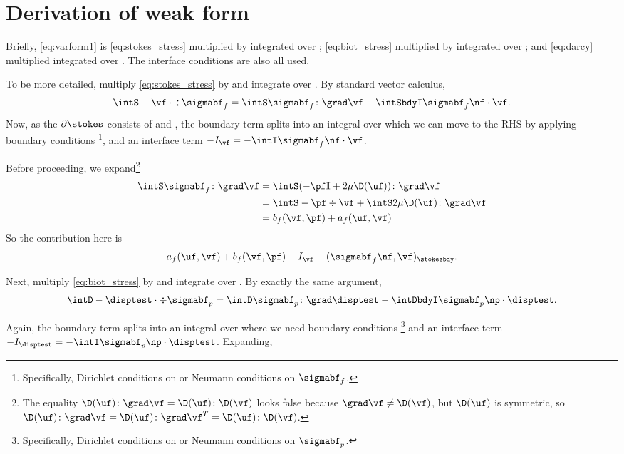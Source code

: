 \documentclass{article}
\begin{document}
\section{Derivation of weak form}
Briefly, \eqref{eq:varform1} is \eqref{eq:stokes_stress} multiplied by \vf integrated over \stokes; \eqref{eq:biot_stress} multiplied by \disptest integrated over \darcy; and \eqref{eq:darcy} multiplied \vp integrated over \darcy. The interface conditions are also all used.

To be more detailed, multiply \eqref{eq:stokes_stress} by \vf and integrate over \stokes. By standard vector calculus,
$$\intS - \vf \cdot \div \sigmabf_f = \intS \sigmabf_f \colon \grad \vf - \intSbdyI \sigmabf_f\nf  \cdot \vf.$$
Now, as the $\partial \stokes$ consists of \stokesbdy and \interface, the boundary term splits into an integral over \stokesbdy which we can move to the RHS by applying boundary conditions \footnote{Specifically, Dirichlet conditions on \uf or Neumann conditions on $\sigmabf_f$.}, and an interface term $-I_{\vf} = -\intI \sigmabf_f \nf \cdot \vf$.

Before proceeding, we expand\footnote{The equality $\D(\uf) \colon \grad \vf = \D(\uf) \colon \D(\vf)$ looks false because $\grad \vf \neq \D(\vf)$, but $\D(\uf)$ is symmetric, so $\D(\uf) \colon \grad \vf = \D(\uf) \colon \grad \vf^T = \D(\uf) \colon \D(\vf)$.}
\begin{align*}
  \intS \sigmabf_f \colon \grad \vf &= \intS (-\pf \mathbf{I} + 2 \mu \D(\uf)) \colon \grad \vf \\
                                    &= \intS -\pf \div \vf + \intS 2 \mu \D(\uf) \colon \grad \vf \\
                                      &= b_f(\vf, \pf) + a_f(\uf, \vf)
\end{align*}
So the contribution here is $$a_f(\uf, \vf) + b_f(\vf, \pf) -I_{\vf} - (\sigmabf_f\nf, \vf)_{\stokesbdy}.$$



Next, multiply \eqref{eq:biot_stress} by \disptest and integrate over \darcy. By exactly the same argument,
$$\intD - \disptest \cdot \div \sigmabf_p = \intD \sigmabf_p \colon \grad \disptest - \intDbdyI \sigmabf_p\np  \cdot \disptest.$$

Again, the boundary term splits into an integral over \darcybdy where we need boundary conditions \footnote{Specifically, Dirichlet conditions on \disp or Neumann conditions on $\sigmabf_p$.} and an interface term $-I_{\disptest} = -\intI \sigmabf_p \np \cdot \disptest$. Expanding,
\end{document}

